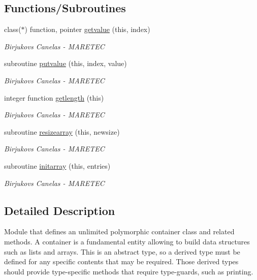 \subsection*{Functions/\+Subroutines}
\begin{DoxyCompactItemize}
\item 
class($\ast$) function, pointer \hyperlink{namespaceabstract__container__array__mod_a2b3e0aec504d76c73bf7f18158924af4}{getvalue} (this, index)
\begin{DoxyCompactList}\small\item\em Birjukovs Canelas -\/ M\+A\+R\+E\+T\+EC \end{DoxyCompactList}\item 
subroutine \hyperlink{namespaceabstract__container__array__mod_aae1f6309c51e282a528ce78f128443e0}{putvalue} (this, index, value)
\begin{DoxyCompactList}\small\item\em Birjukovs Canelas -\/ M\+A\+R\+E\+T\+EC \end{DoxyCompactList}\item 
integer function \hyperlink{namespaceabstract__container__array__mod_a22d71ca3f03bf0bb5d3737338e5e349a}{getlength} (this)
\begin{DoxyCompactList}\small\item\em Birjukovs Canelas -\/ M\+A\+R\+E\+T\+EC \end{DoxyCompactList}\item 
subroutine \hyperlink{namespaceabstract__container__array__mod_ac2d73eb111ffde938f81e3f93b0cb3e0}{resizearray} (this, newsize)
\begin{DoxyCompactList}\small\item\em Birjukovs Canelas -\/ M\+A\+R\+E\+T\+EC \end{DoxyCompactList}\item 
subroutine \hyperlink{namespaceabstract__container__array__mod_a07b39c73368acf72d95a1dbef0f25943}{initarray} (this, entries)
\begin{DoxyCompactList}\small\item\em Birjukovs Canelas -\/ M\+A\+R\+E\+T\+EC \end{DoxyCompactList}\end{DoxyCompactItemize}


\subsection{Detailed Description}
Module that defines an unlimited polymorphic container class and related methods. A container is a fundamental entity allowing to build data structures such as lists and arrays. This is an abstract type, so a derived type must be defined for any specific contents that may be required. Those derived types should provide type-\/specific methods that require type-\/guards, such as printing. 


